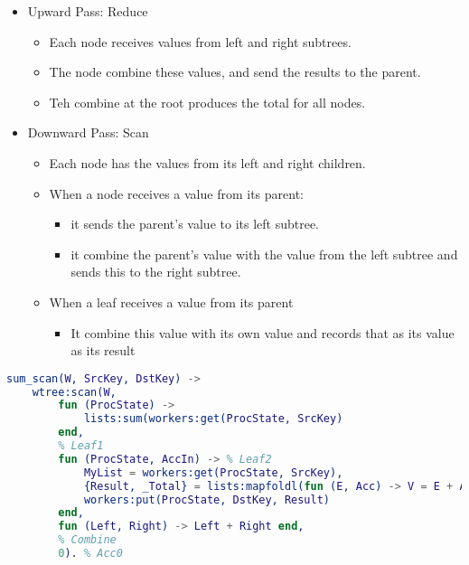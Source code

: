 \documentclass[../main.tex]{subfiles}
\begin{document}
\begin{itemize}
	\item Upward Pass: Reduce
	      \begin{itemize}
		      \item Each node receives values from left and right subtrees.
		      \item The node combine these values, and send the results to the parent.
		      \item Teh combine at the root produces the total for all nodes.
	      \end{itemize}
	\item Downward Pass: Scan
	      \begin{itemize}
		      \item Each node has the values from its left and right children.
		      \item When a node receives a value from its parent:
		            \begin{itemize}
			            \item it sends the parent's value to its left subtree.
			            \item it combine the parent's value with the value from the left subtree and sends this to the right subtree.
		            \end{itemize}
		      \item When a leaf receives a value from its parent
		            \begin{itemize}
			            \item It combine this value with its own value and records that as its value as its result
		            \end{itemize}
	      \end{itemize}
\end{itemize}

\begin{lstlisting}[language=erlang]
    sum_scan(W, SrcKey, DstKey) ->
    wtree:scan(W,
        fun (ProcState) ->
            lists:sum(workers:get(ProcState, SrcKey)
        end,
        % Leaf1
        fun (ProcState, AccIn) -> % Leaf2
            MyList = workers:get(ProcState, SrcKey),
            {Result, _Total} = lists:mapfoldl(fun (E, Acc) -> V = E + Acc, {V, V} end, AccIn, MyList),
            workers:put(ProcState, DstKey, Result)
        end,
        fun (Left, Right) -> Left + Right end,
        % Combine
        0). % Acc0
\end{lstlisting}
\end{document}
